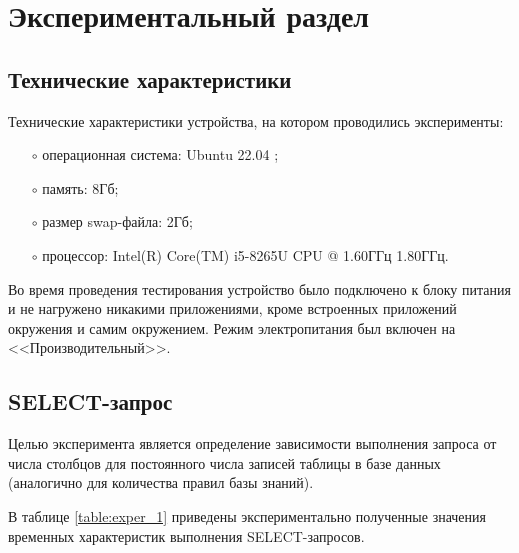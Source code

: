 \chapter{Экспериментальный раздел}
\section{Технические характеристики}
\vspace{-0.5cm}
Технические характеристики устройства, на котором проводились эксперименты:
\begin{itemize}
    \item[$\circ$] операционная система: Ubuntu 22.04 \cite{ubuntu};
    \item[$\circ$] память: 8Гб;
    \item[$\circ$] размер swap-файла: 2Гб;
    \item[$\circ$] процессор: Intel(R) Core(TM) i5-8265U CPU @ 1.60ГГц 1.80ГГц.
\end{itemize}

Во время проведения тестирования устройство было подключено к блоку питания и не нагружено никакими приложениями, кроме встроенных приложений окружения и самим окружением. Режим электропитания был включен на <<Производительный>>.

\section{SELECT-запрос}
\vspace{-0.5cm}
Целью эксперимента является определение зависимости выполнения запроса от числа столбцов для постоянного числа записей таблицы в базе данных (аналогично для количества правил базы знаний). 

В таблице \ref{table:exper_1} приведены экспериментально полученные значения временных характеристик выполнения SELECT-запросов.

